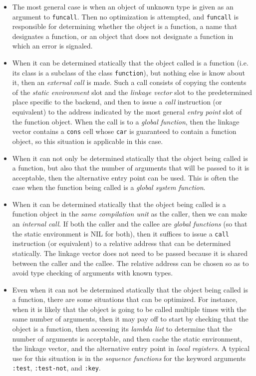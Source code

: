 \begin{itemize}
\item The most general case is when an object of unknown type is given
  as an argument to \texttt{funcall}.  Then no optimization is
  attempted, and \texttt{funcall} is responsible for determining
  whether the object is a function, a name that designates a function,
  or an object that does not designate a function in which an error is
  signaled. 
\item When it can be determined statically that the object called is a
  function (i.e. its class is a subclass of the class
  \texttt{function}), but nothing else is know about it, then an
  \emph{external call} is made.  Such a call consists of copying the
  contents of the \emph{static environment} slot and the \emph{linkage
    vector} slot to the predetermined place specific to the backend,
  and then to issue a \emph{call} instruction (or equivalent) to the
  address indicated by the most general \emph{entry point} slot of the
  function object.  When the call is to a \emph{global function}, then
  the linkage vector contains a \texttt{cons} cell whose \texttt{car}
  is guaranteed to contain a function object, so this situation is
  applicable in this case. 
\item When it can not only be determined statically that the object
  being called is a function, but also that the number of arguments
  that will be passed to it is acceptable, then the alternative entry
  point can be used.  This is often the case when the function being
  called is a \emph{global system function}. 
\item When it can be determined statically that the object being
  called is a function object in the \emph{same compilation unit} as
  the caller, then we can make an \emph{internal call}.  If both the
  caller and the callee are \emph{global functions} (so that the
  static environment is NIL for both), then it suffices to issue a
  \texttt{call} instruction (or equivalent) to a relative address that
  can be determined statically.  The linkage vector does not need to
  be passed because it is shared between the caller and the callee.
  The relative address can be chosen so as to avoid type checking of
  arguments with known types. 
\item Even when it can not be determined statically that the object
  being called is a function, there are some situations that can be
  optimized.  For instance, when it is likely that the object is going
  to be called multiple times with the same number of arguments, then
  it may pay off to start by checking that the object is a function,
  then accessing its \emph{lambda list} to determine that the number
  of arguments is acceptable, and then cache the static environment,
  the linkage vector, and the alternative entry point in \emph{local
    registers}.   A typical use for this situation is in the
  \emph{sequence functions} for the keyword arguments \texttt{:test},
  \texttt{:test-not}, and \texttt{:key}.  
\end{itemize}

